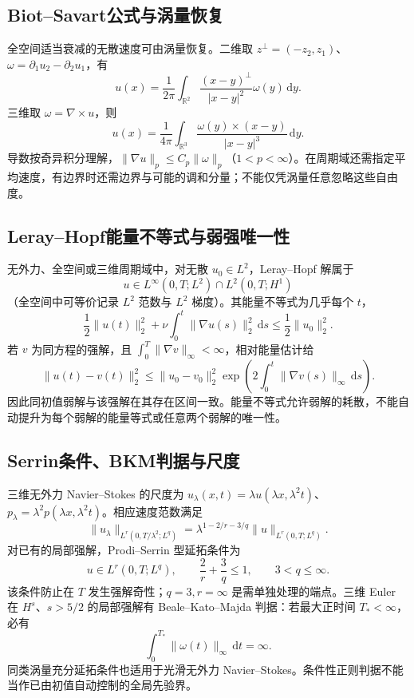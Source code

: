 \documentclass[../main.tex]{subfiles}
\begin{document}
\subsection{Biot--Savart公式与涡量恢复}
全空间适当衰减的无散速度可由涡量恢复。二维取 $z^\perp=(-z_2,z_1)$、$\omega=\partial_1u_2-\partial_2u_1$，有
\[
u(x)=\frac1{2\pi}\int_{\mathbb R^2}
\frac{(x-y)^\perp}{|x-y|^2}\omega(y)\,\mathrm dy.
\]
三维取 $\omega=\nabla\times u$，则
\[
u(x)=\frac1{4\pi}\int_{\mathbb R^3}
\frac{\omega(y)\times(x-y)}{|x-y|^3}\,\mathrm dy.
\]
导数按奇异积分理解，$\|\nabla u\|_p\le C_p\|\omega\|_p$（$1<p<\infty$）。在周期域还需指定平均速度，有边界时还需边界与可能的调和分量；不能仅凭涡量任意忽略这些自由度。
\subsection{Leray--Hopf能量不等式与弱强唯一性}
无外力、全空间或三维周期域中，对无散 $u_0\in L^2$，Leray--Hopf 解属于
\[
u\in L^\infty(0,T;L^2)\cap L^2(0,T;H^1)
\]
（全空间中可等价记录 $L^2$ 范数与 $L^2$ 梯度）。其能量不等式为几乎每个 $t$，
\[
\frac12\|u(t)\|_2^2+\nu\int_0^t\|\nabla u(s)\|_2^2\,\mathrm ds
\le\frac12\|u_0\|_2^2.
\]
若 $v$ 为同方程的强解，且 $\int_0^T\|\nabla v\|_\infty<\infty$，相对能量估计给
\[
\|u(t)-v(t)\|_2^2\le\|u_0-v_0\|_2^2
\exp\left(2\int_0^t\|\nabla v(s)\|_\infty\,\mathrm ds\right).
\]
因此同初值弱解与该强解在其存在区间一致。能量不等式允许弱解的耗散，不能自动提升为每个弱解的能量等式或任意两个弱解的唯一性。
\subsection{Serrin条件、BKM判据与尺度}
三维无外力 Navier--Stokes 的尺度为 $u_\lambda(x,t)=\lambda u(\lambda x,\lambda^2t)$、$p_\lambda=\lambda^2p(\lambda x,\lambda^2t)$。相应速度范数满足
\[
\|u_\lambda\|_{L^r(0,T/\lambda^2;L^q)}
=\lambda^{1-2/r-3/q}\|u\|_{L^r(0,T;L^q)}.
\]
对已有的局部强解，Prodi--Serrin 型延拓条件为
\[
u\in L^r(0,T;L^q),\qquad\frac2r+\frac3q\le1,\qquad3<q\le\infty.
\]
该条件防止在 $T$ 发生强解奇性；$q=3,r=\infty$ 是需单独处理的端点。三维 Euler 在 $H^s$、$s>5/2$ 的局部强解有 Beale--Kato--Majda 判据：若最大正时间 $T_*<\infty$，必有
\[
\int_0^{T_*}\|\omega(t)\|_\infty\,\mathrm dt=\infty.
\]
同类涡量充分延拓条件也适用于光滑无外力 Navier--Stokes。条件性正则判据不能当作已由初值自动控制的全局先验界。

\end{document}
